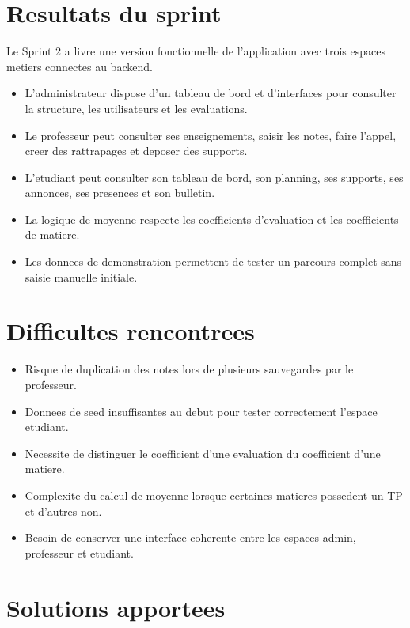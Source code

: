 \documentclass[12pt,a4paper]{report}
\begin{document}
\section{Resultats du sprint}

Le Sprint 2 a livre une version fonctionnelle de l'application avec trois espaces metiers connectes au backend.

\begin{itemize}[itemsep=0.3em]
    \item L'administrateur dispose d'un tableau de bord et d'interfaces pour consulter la structure, les utilisateurs et les evaluations.
    \item Le professeur peut consulter ses enseignements, saisir les notes, faire l'appel, creer des rattrapages et deposer des supports.
    \item L'etudiant peut consulter son tableau de bord, son planning, ses supports, ses annonces, ses presences et son bulletin.
    \item La logique de moyenne respecte les coefficients d'evaluation et les coefficients de matiere.
    \item Les donnees de demonstration permettent de tester un parcours complet sans saisie manuelle initiale.
\end{itemize}

\section{Difficultes rencontrees}

\begin{itemize}[itemsep=0.3em]
    \item Risque de duplication des notes lors de plusieurs sauvegardes par le professeur.
    \item Donnees de seed insuffisantes au debut pour tester correctement l'espace etudiant.
    \item Necessite de distinguer le coefficient d'une evaluation du coefficient d'une matiere.
    \item Complexite du calcul de moyenne lorsque certaines matieres possedent un TP et d'autres non.
    \item Besoin de conserver une interface coherente entre les espaces admin, professeur et etudiant.
\end{itemize}

\section{Solutions apportees}
\end{document}
